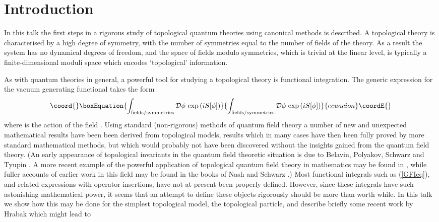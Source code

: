 \documentclass[a4paper,fleqn,12pt]{article}
\providecommand{\Dpath}{{\cal{D}}}
\begin{document}
 \section{Introduction}
%
In this talk the first steps in a rigorous study of topological
quantum theories using canonical methods is described. A
topological theory is characterised by a high degree of symmetry,
with the number of symmetries equal to the number of fields of the
theory. As a result the system has no dynamical degrees of
freedom, and the space of fields modulo symmetries, which is
trivial at the linear level, is typically a finite-dimensional
moduli space which encodes `topological' information.
 \par
As with quantum theories in general, a powerful  tool for studying
a topological theory is functional integration. The generic
expression for the vacuum generating functional takes the form
 \begin{equation}\coord{}\boxEquation{\label{GFIeq}
  \int_{{\rm fields}/{\rm symmetries}} \Dpath \phi \,
    \exp\left( i S[\phi] \right)
 }{\int_{{\rm fields}/{\rm symmetries}} \Dpath \phi \,
    \exp\left( i S[\phi] \right)
 }{ecuacion}\coordE{}\end{equation}
where  \coordHE{} is the action of the field \myHighlight{$\phi$}\coordHE{}. Using standard
(non-rigorous) methods of quantum field theory a number of new and
unexpected mathematical results have been been derived from
topological models, results which in many cases have then been
fully proved by more standard mathematical methods, but which
would probably not have been discovered without the insights
gained from the quantum field theory. (An early appearance of
topological invariants in the quantum field theoretic situation is
due to Belavin, Polyakov, Schwarz and Tyupin \cite{BelPolSchTyu}.
A more recent example of the powerful application of topological
quantum field theory in mathematics may be found in
\cite{Witten94}, while fuller accounts of earlier work in this
field may be found in the books of Nash \cite{Nash} and Schwarz
\cite{Schwar93}.) Most functional integrals such as (\ref{GFIeq}),
and related expressions with operator insertions, have not at
present been properly defined. However, since these integrals have
such astonishing mathematical power, it seems that an attempt to
define these objects rigorously should be more than worth while.
In this talk we show how this may be done for the simplest
topological model, the topological particle, and describe briefly
some recent work by Hrabak \cite{Hrabak} which might lead to
\end{document}
